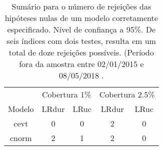 \begin{table}[H]

\caption{\label{tab:}Sumário para o número de rejeições das hipóteses nulas de um modelo 
corretamente especificado. Nível de confiança a 95\%. De seis índices com 
dois testes, resulta em um total de doze rejeições possíveis. 
(Período fora da amostra entre 02/01/2015 e  08/05/2018 .}
\centering
\begin{tabular}[t]{ccccc}
\toprule
\multicolumn{1}{c}{} & \multicolumn{2}{c}{Cobertura 1\%} & \multicolumn{2}{c}{Cobertura 2.5\%} \\
\cmidrule(l{2pt}r{2pt}){2-3} \cmidrule(l{2pt}r{2pt}){4-5}
Modelo & LRdur & LRuc & LRdur & LRuc\\
\midrule
cevt & 0 & 0 & 2 & 0\\
cnorm & 2 & 1 & 2 & 0\\
\bottomrule
\end{tabular}
\end{table}
